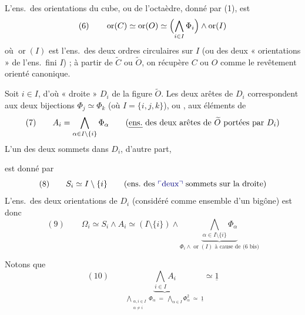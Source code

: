 \documentclass[11pt,a4paper]{article}
\begin{document}
L'ens.\ des orientations du cube, ou de l'octaèdre, donné par (1), est \struck{\ill{} \ill{}}  \ill{}
\[
(6) \qquad \operatorname{or}(C) \simeq \operatorname{or}(O) \simeq \Bigl(\bigwedge_{i \in I} \Phi_i\Bigr) \wedge \operatorname{or}(I)
\]
où $\operatorname{or}(I)$ est l'ens.\ des deux ordres circulaires sur $I$ (ou des deux « orientations » de l'ens.\ fini $I$) ; à partir de $\widetilde{C}$ ou $\widetilde{O}$, on récupère $C$ ou $O$  comme le revêtement orienté canonique.

Soit $i \in I$, d'où « droite » $D_i$ de la figure $\widetilde{O}$. Les deux arêtes de $D_i$ correspondent aux deux bijections $\Phi_j \simeq \Phi_k$ (où $I = \lbrace i, j, k \rbrace$), ou , aux éléments de
\[
(7) \qquad A_i = \bigwedge_{\alpha \in I \setminus \lbrace i \rbrace} \Phi_\alpha
\qquad \text{(\uncertain{ens.}\ des deux arêtes de $\widetilde{O}$ portées par $D_i$)}
\]
L'un des deux sommets dans $D_i$, d'autre part,

est donné par
\[
(8) \qquad S_i \simeq I \setminus \lbrace i \rbrace
\qquad \text{(ens.\ des \add{deux} sommets sur la droite)}
\]
L'ens.\ des deux orientations de $D_i$ (considéré comme ensemble d'un bigône) est donc
\[
(9) \qquad \Omega_i \simeq S_i \wedge A_i \simeq (I \setminus \lbrace i \rbrace) \wedge \underbrace{\bigwedge_{\alpha \in I \setminus \lbrace i \rbrace} \Phi_\alpha}_{\Phi_i \wedge \operatorname{or}(I) \text{ à cause de (6 bis)}}
\]

Notons que
\[
(10) \qquad \underbrace{\bigwedge_{i \in I} A_i}_{\bigwedge_{\substack{\alpha, i \in I \\ \alpha \neq i}} \Phi_\alpha \;=\; \bigwedge_{\alpha \in I} \Phi_\alpha^2 \;\simeq\; \underline{1}} \simeq \underline{1}
\]
\end{document}
